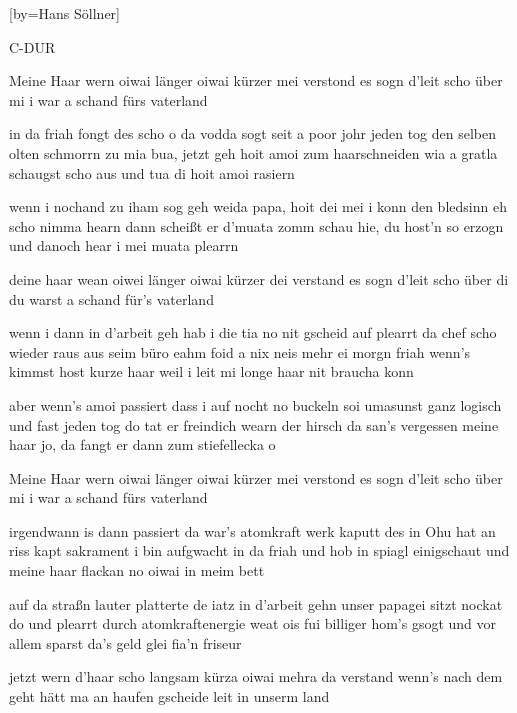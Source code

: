 
[by={Hans Söllner}]

\chordsoff

\beginverse
\nolyrics C-DUR
\endverse

\beginchorus
Meine Haar wern oiwai länger 
oiwai kürzer mei verstond
es sogn d'leit scho über mi
i war a schand
fürs vaterland
\endchorus

\beginverse
in da friah fongt des scho o
da vodda sogt seit a poor johr
jeden tog den selben olten schmorrn zu mia
bua, jetzt geh hoit amoi zum haarschneiden
wia a gratla schaugst scho aus
und tua di hoit amoi rasiern
\endverse

\beginverse
wenn i nochand zu iham sog
geh weida papa, hoit dei mei
i konn den bledsinn eh scho nimma hearn
dann scheißt er d'muata zomm
schau hie, du host'n so erzogn
und danoch hear i mei muata plearrn
\endverse

\beginchorus
deine haar wean oiwei länger 
oiwai kürzer dei verstand
es sogn d'leit scho über di
du warst a schand 
für's vaterland
\endchorus

\beginverse
wenn i dann in d'arbeit geh
hab i die tia no nit gscheid auf
plearrt da chef scho wieder raus aus seim büro
eahm foid a nix neis mehr ei
morgn friah wenn's kimmst host kurze haar
weil i leit mi longe haar nit braucha konn
\endverse

\beginverse
aber wenn's amoi passiert 
dass i auf nocht no buckeln soi
umasunst ganz logisch und fast jeden tog
do tat er freindich wearn der hirsch
da san's vergessen meine haar
jo, da fangt er dann zum stiefellecka o
\endverse

\beginchorus
Meine Haar wern oiwai länger 
oiwai kürzer mei verstond
es sogn d'leit scho über mi
i war a schand
fürs vaterland
\endchorus

\beginverse
irgendwann is dann passiert
da war's atomkraft werk kaputt
des in Ohu hat an riss kapt sakrament
i bin aufgwacht in da friah
und hob in spiagl einigschaut
und meine haar flackan no oiwai in meim bett
\endverse

\beginverse
auf da straßn lauter platterte
de iatz in d'arbeit gehn
unser papagei sitzt nockat do und plearrt
durch atomkraftenergie
weat ois fui billiger hom's gsogt
und vor allem sparst da's geld glei fia'n friseur
\endverse

\beginchorus
jetzt wern d'haar scho langsam kürza
oiwai mehra da verstand
wenn's nach dem geht
hätt ma an haufen gscheide leit
in unserm land
\endchorus

\endsong